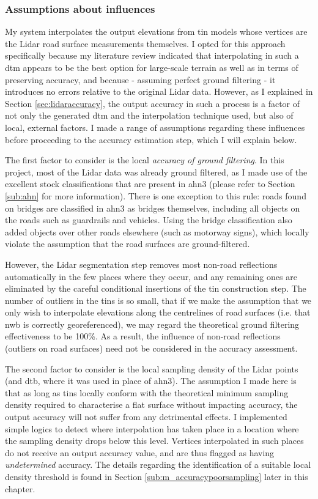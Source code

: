 \subsubsection{Assumptions about influences}

My system interpolates the output elevations from \ac{tin} models whose vertices are the Lidar road surface measurements themselves. I opted for this approach specifically because my literature review indicated that interpolating in such a \ac{dtm} appears to be the best option for large-scale terrain as well as in terms of preserving accuracy, and because - assuming perfect ground filtering - it introduces no errors relative to the original Lidar data. However, as I explained in Section \ref{sec:lidaraccuracy}, the output accuracy in such a process is a factor of not only the generated \ac{dtm} and the interpolation technique used, but also of local, external factors. I made a range of assumptions regarding these influences before proceeding to the accuracy estimation step, which I will explain below.

The first factor to consider is the local \textit{accuracy of ground filtering}. In this project, most of the Lidar data was already ground filtered, as I made use of the excellent stock classifications that are present in \ac{ahn3} (please refer to Section \ref{sub:ahn} for more information). There is one exception to this rule: roads found on bridges are classified in \ac{ahn3} as bridges themselves, including all objects on the roads such as guardrails and vehicles. Using the bridge classification also added objects over other roads elsewhere (such as motorway signs), which locally violate the assumption that the road surfaces are ground-filtered.

However, the Lidar segmentation step removes most non-road reflections automatically in the few places where they occur, and any remaining ones are eliminated by the careful conditional insertions of the \ac{tin} construction step. The number of outliers in the \ac{tin}s is so small, that if we make the assumption that we only wish to interpolate elevations along the centrelines of road surfaces (i.e. that \ac{nwb} is correctly georeferenced), we may regard the theoretical ground filtering effectiveness to be 100\%. As a result, the influence of non-road reflections (outliers on road surfaces) need not be considered in the accuracy assessment.

The second factor to consider is the local sampling density of the Lidar points (and \ac{dtb}, where it was used in place of \ac{ahn3}). The assumption I made here is that as long as \ac{tin}s locally conform with the theoretical minimum sampling density required to characterise a flat surface without impacting accuracy, the output accuracy will not suffer from any detrimental effects. I implemented simple logics to detect where interpolation has taken place in a location where the sampling density drops below this level. Vertices interpolated in such places do not receive an output accuracy value, and are thus flagged as having \textit{undetermined} accuracy. The details regarding the identification of a suitable local density threshold is found in Section \ref{sub:m_accuracypoorsampling} later in this chapter.

